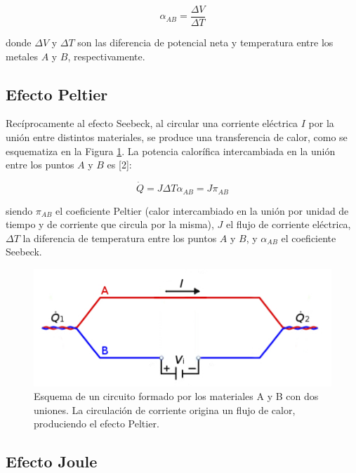 \documentclass[twoside,twocolumn,a4paper]{article}
\begin{document}
\begin{equation}
\label{eq:seebeck2}
\alpha_{AB} = \frac{\Delta V}{\Delta T}
\end{equation}

donde $\Delta V$ y $\Delta T$ son las diferencia de potencial neta  y temperatura entre los metales $A$ y $B$, respectivamente.

\subsection{Efecto Peltier}

Rec\'iprocamente al efecto Seebeck, al circular una corriente el\'ectrica $I$ por la uni\'on entre distintos materiales, se produce una transferencia de calor, como se esquematiza en la Figura \ref{fig:peltier}. La potencia calor\'ifica intercambiada en la uni\'on entre los puntos $A$ y $B$ es [2]:

\begin{equation}
\label{eq:peltier}
\dot{Q} = J\Delta T \alpha_{AB} = J \pi_{AB}
\end{equation}

siendo $\pi_{AB}$ el coeficiente Peltier (calor intercambiado en la uni\'on por unidad de tiempo y de corriente que circula por la misma), $J$ el flujo de corriente el\'ectrica, $\Delta T$ la diferencia de temperatura entre los puntos $A$ y $B$, y $\alpha_{AB}$ el coeficiente Seebeck.


\begin{figure}[H]
\includegraphics[width=\linewidth]{peltier.jpg}
\caption{Esquema de un circuito formado por los materiales A y B con dos uniones. La circulaci\'on de corriente origina un flujo de calor, produciendo el efecto Peltier.}
\label{fig:peltier}
\end{figure}

\subsection{Efecto Joule}
\end{document}
